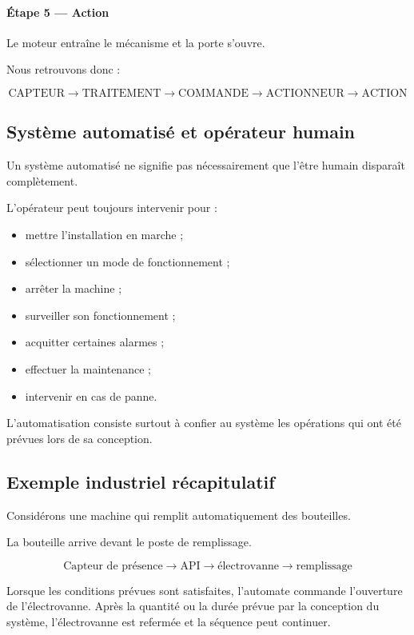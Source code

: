 \documentclass[12pt,a4paper]{book}
\begin{document}
\paragraph{Étape 5 --- Action}

Le moteur entraîne le mécanisme et la porte s'ouvre.

Nous retrouvons donc :

\[
\text{CAPTEUR} \rightarrow \text{TRAITEMENT} \rightarrow \text{COMMANDE} \rightarrow \text{ACTIONNEUR} \rightarrow \text{ACTION}
\]

\subsection{Système automatisé et opérateur humain}

Un système automatisé ne signifie pas nécessairement que l'être humain disparaît complètement.

L'opérateur peut toujours intervenir pour :

\begin{itemize}
    \item mettre l'installation en marche ;
    \item sélectionner un mode de fonctionnement ;
    \item arrêter la machine ;
    \item surveiller son fonctionnement ;
    \item acquitter certaines alarmes ;
    \item effectuer la maintenance ;
    \item intervenir en cas de panne.
\end{itemize}

L'automatisation consiste surtout à confier au système les opérations qui ont été prévues lors de sa conception.

\subsection{Exemple industriel récapitulatif}

Considérons une machine qui remplit automatiquement des bouteilles.

La bouteille arrive devant le poste de remplissage.

\[
\text{Capteur de présence} \rightarrow \text{API} \rightarrow \text{électrovanne} \rightarrow \text{remplissage}
\]

Lorsque les conditions prévues sont satisfaites, l'automate commande l'ouverture de l'électrovanne. Après la quantité ou la durée prévue par la conception du système, l'électrovanne est refermée et la séquence peut continuer.
\end{document}
